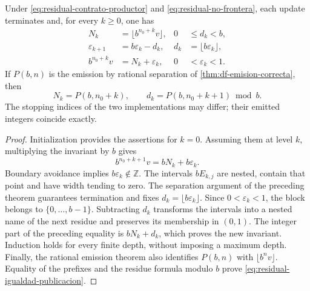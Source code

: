 \begin{theorem}
\label{thm:residual-compatibilidad-universal}
Under \eqref{eq:residual-contrato-productor} and
\eqref{eq:residual-no-frontera}, each update terminates and, for every
\(k\geq0\), one has
\begin{align}
 N_k&=\lfloor b^{n_0+k}v\rfloor,
 &0&\leq d_k<b,\label{eq:residual-prefijos-k}\\
 \varepsilon_{k+1}&=b\varepsilon_k-d_k,
 &d_k&=\lfloor b\varepsilon_k\rfloor,\label{eq:residual-recurrencia}\\
 b^{n_0+k}v&=N_k+\varepsilon_k,
 &0&<\varepsilon_k<1.\label{eq:residual-invariante}
\end{align}
If \(P(b,n)\) is the emission by rational separation of
\cref{thm:df-emision-correcta}, then
\begin{equation}
 N_k=P(b,n_0+k),\qquad
 d_k=P(b,n_0+k+1)\bmod b.
 \label{eq:residual-igualdad-publicacion}
\end{equation}
The stopping indices of the two implementations may differ;
their emitted integers coincide exactly.
\end{theorem}
\begin{proof}
Initialization provides the assertions for \(k=0\). Assuming them
at level \(k\), multiplying the invariant by \(b\) gives
\[
 b^{n_0+k+1}v=bN_k+b\varepsilon_k.
\]
Boundary avoidance implies \(b\varepsilon_k\notin\mathbb Z\).
The intervals \(bE_{k,j}\) are nested, contain that point and have
width tending to zero. The separation argument of the preceding theorem
guarantees termination and fixes
\(d_k=\lfloor b\varepsilon_k\rfloor\). Since
\(0<\varepsilon_k<1\), the block belongs to
\(\{0,\ldots,b-1\}\). Subtracting \(d_k\) transforms the intervals into
a nested name of the next residue and preserves its membership in
\((0,1)\). The integer part of the preceding equality is
\(bN_k+d_k\), which proves the new invariant. Induction holds for
every finite depth, without imposing a maximum depth.
Finally, the rational emission theorem also identifies
\(P(b,n)\) with \(\lfloor b^n v\rfloor\). Equality of the
prefixes and the residue formula modulo \(b\) prove
\eqref{eq:residual-igualdad-publicacion}.
\end{proof}


